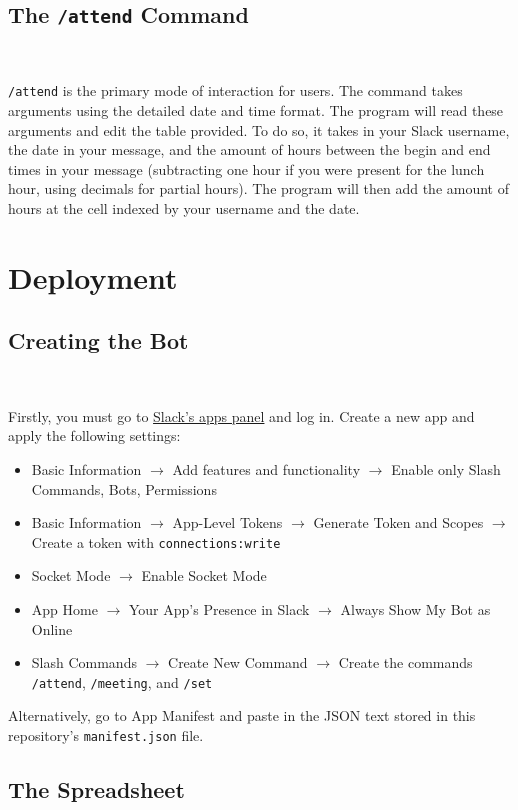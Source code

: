 \documentclass{article}
\begin{document}
\subsection{The \texttt{/attend} Command}

\

\texttt{/attend} is the primary mode of interaction for users. The command takes arguments using the detailed date and time format. The program will read these arguments and edit the table provided. To do so, it takes in your Slack username, the date in your message, and the amount of hours between the begin and end times in your message (subtracting one hour if you were present for the lunch hour, using decimals for partial hours). The program will then add the amount of hours at the cell indexed by your username and the date.

\section{Deployment}

\subsection{Creating the Bot}

\

Firstly, you must go to \href{https://api.slack.com/apps}{Slack's apps panel} and log in. Create a new app and apply the following settings:
\begin{itemize}
	\item Basic Information $\to$ Add features and functionality $\to$ Enable only Slash Commands, Bots, Permissions
	\item Basic Information $\to$ App-Level Tokens $\to$ Generate Token and Scopes $\to$ Create a token with \texttt{connections:write}
	\item Socket Mode $\to$ Enable Socket Mode
	\item App Home $\to$ Your App’s Presence in Slack $\to$ Always Show My Bot as Online
	\item Slash Commands $\to$ Create New Command $\to$ Create the commands \texttt{/attend}, \texttt{/meeting}, and \texttt{/set}
\end{itemize}

Alternatively, go to App Manifest and paste in the JSON text stored in this repository's \texttt{manifest.json} file.

\subsection{The Spreadsheet}
\end{document}
